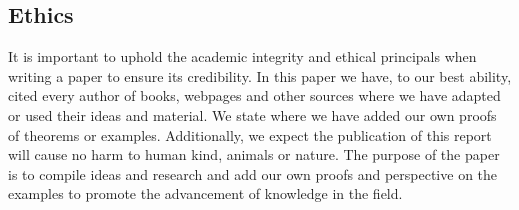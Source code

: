\documentclass[11pt,a4paper]{article}
\theoremstyle{definition}
\numberwithin{equation}{section}
\begin{document}
\subsection{Ethics}
\label{ss:ethics} 
It is important to uphold the academic integrity and ethical principals when writing a paper to ensure its credibility. In this paper we have, to our best ability, cited every author of books, webpages and other sources where we have adapted or used their ideas and material. We state where we have added our own proofs of theorems or examples. Additionally, we expect the publication of this report will cause no harm to human kind, animals or nature. The purpose of the paper is to compile ideas and research and add our own proofs and perspective on the examples to promote the advancement of knowledge in the field.
\pagebreak
\end{document}
